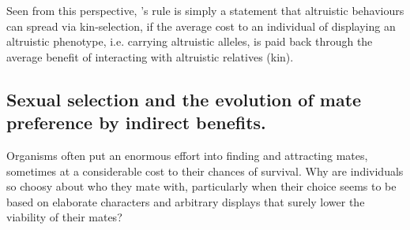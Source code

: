 Seen from this perspective, \citeauthor{hamilton1964genetical}'s rule
is simply a statement that altruistic behaviours can spread via
kin-selection, if the average cost to an individual of displaying an
altruistic phenotype, i.e. carrying altruistic alleles, is paid back through the average benefit of interacting with altruistic relatives (kin).





\subsection{Sexual selection and the evolution of mate preference by indirect benefits. }


Organisms often put an enormous effort into finding and attracting mates, sometimes at
a considerable cost to their chances of survival. Why are individuals so choosy about who they mate with, particularly when their choice seems to be based on elaborate characters and arbitrary displays
that surely lower the viability of their mates?  



